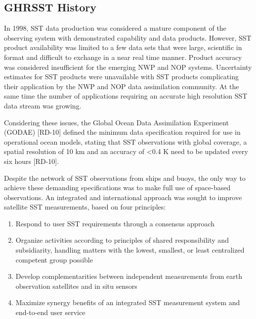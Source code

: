 \subsection{GHRSST History}
In 1998, SST data production was considered a mature component of the observing system with demonstrated capability and data products.
However, SST product availability was limited to a few data sets that were large, scientific in format and difficult to exchange in a near real time manner.
Product accuracy was considered insufficient for the emerging NWP and NOP systems.
Uncertainty estimates for SST products were unavailable with SST products complicating their application by the NWP and NOP data assimilation community.
At the same time the number of applications requiring an accurate high resolution SST data stream was growing.
\par\vspace{0.25cm}
Considering these issues, the Global Ocean Data Assimilation Experiment (GODAE) [RD-10] defined the minimum data specification required for use in operational ocean models, stating that SST observations with global coverage, a spatial resolution of 10 km and an accuracy of <0.4 K need to be updated every six hours [RD-10].
\par\vspace{0.25cm}
Despite the network of SST observations from ships and buoys, the only way to achieve these demanding specifications was to make full use of space-based observations.
An integrated and international approach was sought to improve satellite SST measurements, based on four principles:\par\vspace{0.25cm}
\begin{enumerate}
    \item{Respond to user SST requirements through a consensus approach}
    \item{Organize activities according to principles of shared responsibility and subsidiarity, handling matters with the lowest, smallest, or least centralized competent group possible}
    \item{Develop complementarities between independent measurements from earth observation satellites and in situ sensors }
    \item{Maximize synergy benefits of an integrated SST measurement system and end-to-end user service}
\end{enumerate}
\par\vspace{0.25cm}
